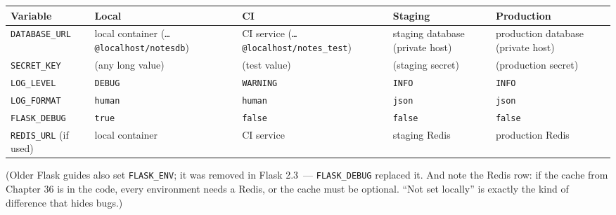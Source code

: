 {\def\LTcaptype{none} %
\begin{longtable}[]{@{}
  >{\raggedright\arraybackslash}p{}
  >{\raggedright\arraybackslash}p{}
  >{\raggedright\arraybackslash}p{}
  >{\raggedright\arraybackslash}p{}
  >{\raggedright\arraybackslash}p{}@{}}
\toprule\noalign{}
\begin{minipage}[b]{\linewidth}\raggedright
Variable
\end{minipage} & \begin{minipage}[b]{\linewidth}\raggedright
Local
\end{minipage} & \begin{minipage}[b]{\linewidth}\raggedright
CI
\end{minipage} & \begin{minipage}[b]{\linewidth}\raggedright
Staging
\end{minipage} & \begin{minipage}[b]{\linewidth}\raggedright
Production
\end{minipage} \\
\midrule\noalign{}
\endhead
\bottomrule\noalign{}
\endlastfoot
\texttt{DATABASE\_URL} & local container (\texttt{…@localhost/}\allowbreak{}\texttt{notesdb}) & CI service (\texttt{…@localhost/}\allowbreak{}\texttt{notes\_test}) & staging database (private host) & production database (private host) \\
\texttt{SECRET\_KEY} & (any long value) & (test value) & (staging secret) & (production secret) \\
\texttt{LOG\_LEVEL} & \texttt{DEBUG} & \texttt{WARNING} & \texttt{INFO} & \texttt{INFO} \\
\texttt{LOG\_FORMAT} & \texttt{human} & \texttt{human} & \texttt{json} & \texttt{json} \\
\texttt{FLASK\_DEBUG} & \texttt{true} & \texttt{false} & \texttt{false} & \texttt{false} \\
\texttt{REDIS\_URL} (if used) & local container & CI service & staging Redis & production Redis \\
\end{longtable}
}

(Older Flask guides also set \texttt{FLASK\_ENV}; it was removed in Flask 2.3~--- \texttt{FLASK\_DEBUG} replaced it. And note the Redis row: if the cache from Chapter 36 is in the code, every environment needs a Redis, or the cache must be optional. ``Not set locally'' is exactly the kind of difference that hides bugs.)

